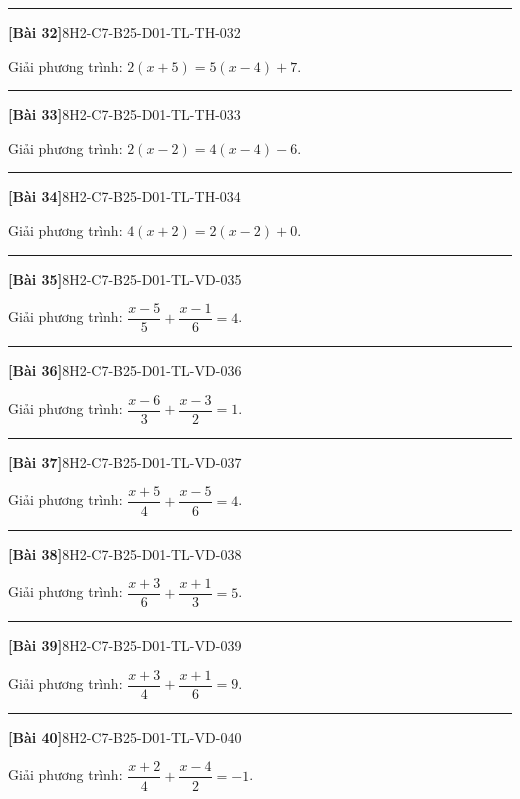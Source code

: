 \documentclass[12pt,a4paper]{article}
\newif\ifloigiai
\newenvironment{cauhoi}[2]{%
  \par\medskip\noindent\rule{\textwidth}{0.4pt}\par\nopagebreak
  \noindent\textbf{[#1]}\hfill{\scriptsize\ttfamily #2}\par\nopagebreak\smallskip}{\par}
\newcommand{\loigiai}[1]{\ifloigiai\par\smallskip\noindent\textit{Lời giải.} #1\par\fi}
\begin{document}
\begin{cauhoi}{Bài 32}{8H2-C7-B25-D01-TL-TH-032}
Giải phương trình: $2(x + 5)=5(x - 4)+7$.
\loigiai{Khai triển hai vế: $2x + 10=5x - 13$. Chuyển vế, thu gọn ta được $-3x=-23$, suy ra $x=\dfrac{23}{3}$.}
\end{cauhoi}
\begin{cauhoi}{Bài 33}{8H2-C7-B25-D01-TL-TH-033}
Giải phương trình: $2(x - 2)=4(x - 4)-6$.
\loigiai{Khai triển hai vế: $2x - 4=4x - 22$. Chuyển vế, thu gọn ta được $-2x=-18$, suy ra $x=9$.}
\end{cauhoi}
\begin{cauhoi}{Bài 34}{8H2-C7-B25-D01-TL-TH-034}
Giải phương trình: $4(x + 2)=2(x - 2)+0$.
\loigiai{Khai triển hai vế: $4x + 8=2x - 4$. Chuyển vế, thu gọn ta được $2x=-12$, suy ra $x=-6$.}
\end{cauhoi}
\begin{cauhoi}{Bài 35}{8H2-C7-B25-D01-TL-VD-035}
Giải phương trình: $\dfrac{x - 5}{5}+\dfrac{x - 1}{6}=4$.
\loigiai{Quy đồng, nhân hai vế với $30$: $6(x - 5)+5(x - 1)=120$, tức là $11x - 35=120$. Suy ra $11x=155$, nên $x=\dfrac{155}{11}$.}
\end{cauhoi}
\begin{cauhoi}{Bài 36}{8H2-C7-B25-D01-TL-VD-036}
Giải phương trình: $\dfrac{x - 6}{3}+\dfrac{x - 3}{2}=1$.
\loigiai{Quy đồng, nhân hai vế với $6$: $2(x - 6)+3(x - 3)=6$, tức là $5x - 21=6$. Suy ra $5x=27$, nên $x=\dfrac{27}{5}$.}
\end{cauhoi}
\begin{cauhoi}{Bài 37}{8H2-C7-B25-D01-TL-VD-037}
Giải phương trình: $\dfrac{x + 5}{4}+\dfrac{x - 5}{6}=4$.
\loigiai{Quy đồng, nhân hai vế với $12$: $3(x + 5)+2(x - 5)=48$, tức là $5x + 5=48$. Suy ra $5x=43$, nên $x=\dfrac{43}{5}$.}
\end{cauhoi}
\begin{cauhoi}{Bài 38}{8H2-C7-B25-D01-TL-VD-038}
Giải phương trình: $\dfrac{x + 3}{6}+\dfrac{x + 1}{3}=5$.
\loigiai{Quy đồng, nhân hai vế với $6$: $(x + 3)+2(x + 1)=30$, tức là $3x + 5=30$. Suy ra $3x=25$, nên $x=\dfrac{25}{3}$.}
\end{cauhoi}
\begin{cauhoi}{Bài 39}{8H2-C7-B25-D01-TL-VD-039}
Giải phương trình: $\dfrac{x + 3}{4}+\dfrac{x + 1}{6}=9$.
\loigiai{Quy đồng, nhân hai vế với $12$: $3(x + 3)+2(x + 1)=108$, tức là $5x + 11=108$. Suy ra $5x=97$, nên $x=\dfrac{97}{5}$.}
\end{cauhoi}
\begin{cauhoi}{Bài 40}{8H2-C7-B25-D01-TL-VD-040}
Giải phương trình: $\dfrac{x + 2}{4}+\dfrac{x - 4}{2}=-1$.
\loigiai{Quy đồng, nhân hai vế với $4$: $(x + 2)+2(x - 4)=-4$, tức là $3x - 6=-4$. Suy ra $3x=2$, nên $x=\dfrac{2}{3}$.}
\end{cauhoi}
\end{document}
